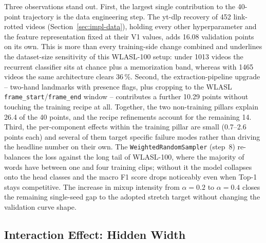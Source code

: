 Three observations stand out. First, the largest single contribution to the
40-point trajectory is the data engineering step. The yt-dlp recovery of
452 link-rotted videos (Section~\ref{sec:impl-data}), holding every other
hyperparameter and the feature representation fixed at their V1 values,
adds 16.08 validation points on its own. This is more than every
training-side change combined and underlines the dataset-size sensitivity
of this WLASL-100 setup: under \num{1013} videos the recurrent classifier
sits at chance plus a memorization band, whereas with \num{1465} videos the
same architecture clears 36\,\%. Second, the extraction-pipeline upgrade -- two-hand
landmarks with presence flags, plus cropping to the WLASL
\texttt{frame\_start}/\texttt{frame\_end} window -- contributes a further
10.29 points without touching the training recipe at all. Together, the
two non-training pillars explain 26.4 of the 40 points, and the recipe
refinements account for the remaining 14. Third, the per-component effects
within the training pillar are small (\SIrange{0.7}{2.6}{} points each)
and several of them target specific failure modes rather than driving the
headline number on their own. The \texttt{WeightedRandomSampler} (step~8)
re-balances the loss against the long tail of WLASL-100, where the
majority of words have between one and four training clips; without it
the model collapses onto the head classes and the macro F1 score drops
noticeably even when Top-1 stays competitive. The increase in mixup
intensity from $\alpha = 0.2$ to $\alpha = 0.4$ closes the remaining
single-seed gap to the adopted stretch target without changing the
validation curve shape.

\subsection{Interaction Effect: Hidden Width}
\label{sec:results-ablation-interaction}

